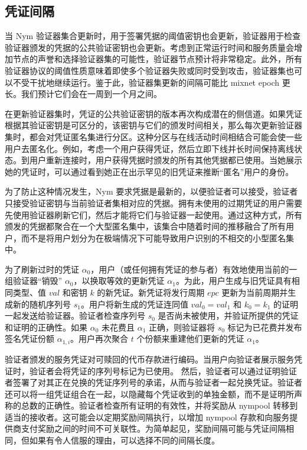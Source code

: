 \documentclass{article}
\begin{document}
	\subsection{凭证间隔}

	当 Nym 验证器集合更新时，用于签署凭据的阈值密钥也会更新，验证器用于检查验证器颁发的凭据的公共验证密钥也会更新。考虑到正常运行时间和服务质量会增加节点的声誉和选择验证器集的可能性，验证器节点预计将非常稳定。此外，所有验证器协议的阈值性质意味着即使多个验证器失败或同时受到攻击，验证器集也可以不受干扰地继续运行。鉴于此，验证器集更新的间隔可能比 mixnet epoch 更长。我们预计它们会在一周到一个月之间。\newline

	在更新验证器集时，凭证的公共验证密钥的版本再次构成潜在的侧信道。如果凭证根据其验证密钥是可区分的，该密钥与它们的颁发时间相关，那么每次更新验证器集时，都会对凭证匿名集进行分区。这种分区与在线活动时间相结合可能会使一些用户去匿名化。例如，考虑一个用户获得凭证，然后立即下线并长时间保持离线状态。到用户重新连接时，用户获得凭据时颁发的所有其他凭据都已使用。当她展示她的凭证时，可以通过看到她正在出示罕见的旧凭证来推断“匿名”用户的身份。\newline

	为了防止这种情况发生，Nym 要求凭据是最新的，以便验证者可以接受，验证者只接受验证密钥与当前验证者集相对应的凭据。拥有未使用的过期凭证的用户需要先使用验证器刷新它们，然后才能将它们与验证器一起使用。通过这种方式，所有颁发的凭据都聚合在一个大型匿名集中，该集合中随着时间的推移融合了所有用户，而不是将用户划分为在极端情况下可能导致用户识别的不相交的小型匿名集中。\newline

	为了刷新过时的凭证 $\alpha_{0}$，用户（或任何拥有凭证的参与者）有效地使用当前的一组验证器“销毁” $\alpha_{0}$，以换取等效的更新凭证 $\alpha_{1}$。为此，用户生成与旧凭证具有相同类型、值 $val$ 和密钥 $k$ 的新凭证。新凭证将发行周期 $epc$ 更新为当前周期并生成新的随机序列号 $s_{1}$。用户将新生成的凭证连同值 $val_{0} = val_{1}$ 和 $k_{0} = k_{1}$ 的证明一起发送给验证器。验证者检查序列号 $s_{0}$ 是否尚未被使用，并验证所提供的凭证和证明的正确性。如果 $\alpha_{0}$ 未花费且 $\alpha_{1}$ 正确，则验证器将 $s_{0}$ 标记为已花费并发布签名凭证份额 $\alpha_{1,i}$。用户再次聚合 $t$ 个份额来重建他们更新的凭证 $\alpha_{1}$。\newline

	验证者颁发的服务凭证对可赎回的代币存款进行编码。当用户向验证者展示服务凭证时，验证者会将凭证的序列号标记为已使用。 然后，验证者可以通过证明验证者签署了对其正在兑换的凭证序列号的承诺，从而与验证者一起兑换凭证。验证者还可以将一组凭证组合在一起，以隐藏每个凭证收到的单独金额，而不是证明所声称的总数的正确性。验证者检查所有证明的有效性，并将奖励从 nympool 转移到适当的接收者。这可能会以定期奖励间隔执行，以增加 nympool 存款和向服务提供商支付奖励之间的时间不可关联性。为简单起见，奖励间隔可能与凭证间隔相同，但如果有令人信服的理由，可以选择不同的间隔长度。\newline
\end{document}
